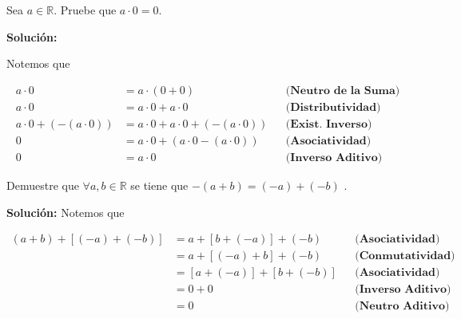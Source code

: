 \documentclass[12pt]{book}
\begin{document}
\begin{prob}
\quad \quad 
    Sea $a \in \mathbb{R}$. Pruebe que $a \cdot 0 = 0$.
\end{prob} \label{prob: 1.0.4}
\textbf{Solución:}

Notemos que 

\begin{align*}
   a \cdot 0 &= a \cdot (0 + 0 )  && \textbf{(Neutro de la Suma)} \\
 a\cdot 0 &= a \cdot 0 + a \cdot 0 && \textbf{(Distributividad)} \\
  a\cdot 0 + (-(a\cdot 0)) &= a\cdot 0 + a \cdot 0 + (-(a\cdot 0)) && \textbf{(Exist. Inverso)} \\
  0&= a\cdot 0 + (  a \cdot 0 -(a\cdot 0) ) && \textbf{(Asociatividad)} \\
  0&= a\cdot 0 && \textbf{(Inverso Aditivo)}
\end{align*}

\begin{prob}
\quad \quad 
    Demuestre que $\forall a, b \in \mathbb{R}$ se tiene que $-(a+b) = (-a) + (-b)$ .
\end{prob}
\textbf{Solución:} Notemos que

\begin{align*}
    (a+b)+ [(-a)+(-b)] &= a + [b+ (-a)] + (-b)   && \textbf{(Asociatividad)} \\
    &= a + [(-a) + b ]+ (-b) && \textbf{(Conmutatividad)} \\
    &= [a + (-a)]+ [b + (-b)] && \textbf{(Asociatividad)} \\
    &= 0 + 0  && \textbf{(Inverso Aditivo)} \\
    &=0 && \textbf{(Neutro Aditivo)}
\end{align*}
\end{document}
